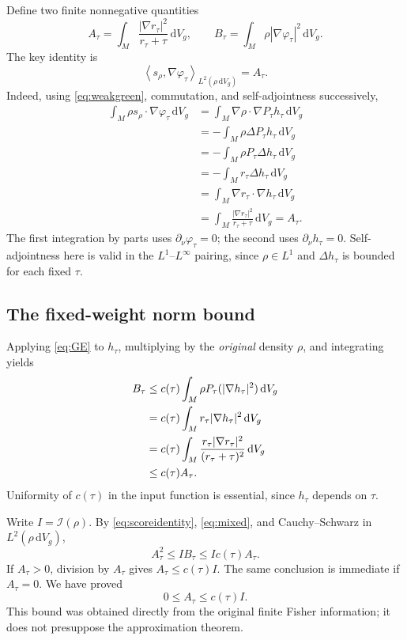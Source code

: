 \documentclass[11pt]{article}
\newcommand{\dd}{\,\mathrm{d}}
\newcommand{\dV}{\dd V_g}
\newcommand{\I}{\mathcal I}
\newcommand{\iprho}[2]{\left\langle #1,#2\right\rangle_{L^2(\rho\,\mathrm{d}V_g)}}
\begin{document}
Define two finite nonnegative quantities
\begin{equation}\label{eq:AB}
 A_\tau=\int_M\frac{|\nabla r_\tau|^2}{r_\tau+\tau}\dV,
 \qquad B_\tau=\int_M\rho|\nabla\varphi_\tau|^2\dV.
\end{equation}
The key identity is
\begin{equation}\label{eq:mixed}
 \iprho{s_\rho}{\nabla\varphi_\tau}=A_\tau.
\end{equation}
Indeed, using \eqref{eq:weakgreen}, commutation, and self-adjointness successively,
\begin{align*}
 \int_M\rho s_\rho\cdot\nabla\varphi_\tau\dV
 &=\int_M\nabla\rho\cdot\nabla P_\tau h_\tau\dV\\
 &=-\int_M\rho\Delta P_\tau h_\tau\dV\\
 &=-\int_M\rho P_\tau\Delta h_\tau\dV\\
 &=-\int_M r_\tau\Delta h_\tau\dV\\
 &=\int_M\nabla r_\tau\cdot\nabla h_\tau\dV\\
 &=\int_M\frac{|\nabla r_\tau|^2}{r_\tau+\tau}\dV=A_\tau.
\end{align*}
The first integration by parts uses $\partial_\nu\varphi_\tau=0$; the second uses $\partial_\nu h_\tau=0$. Self-adjointness here is valid in the $L^1$--$L^\infty$ pairing, since $\rho\in L^1$ and $\Delta h_\tau$ is bounded for each fixed $\tau$.

\subsection{The fixed-weight norm bound}
Applying \eqref{eq:GE} to $h_\tau$, multiplying by the \emph{original} density $\rho$, and integrating yields
\begin{align}
 B_\tau
 &\leq c(\tau)\int_M\rho P_\tau(|\nabla h_\tau|^2)\dV\notag\\
 &=c(\tau)\int_M r_\tau|\nabla h_\tau|^2\dV\notag\\
 &=c(\tau)\int_M\frac{r_\tau|\nabla r_\tau|^2}{(r_\tau+\tau)^2}\dV\notag\\
 &\leq c(\tau)A_\tau.\label{eq:Bbound}
\end{align}
Uniformity of $c(\tau)$ in the input function is essential, since $h_\tau$ depends on $\tau$.

Write $I=\I(\rho)$. By \eqref{eq:scoreidentity}, \eqref{eq:mixed}, and Cauchy--Schwarz in $L^2(\rho\,\mathrm{d}V_g)$,
\[
 A_\tau^2\leq I B_\tau\leq I c(\tau)A_\tau.
\]
If $A_\tau>0$, division by $A_\tau$ gives $A_\tau\leq c(\tau)I$. The same conclusion is immediate if $A_\tau=0$. We have proved
\begin{equation}\label{eq:Abound}
 0\leq A_\tau\leq c(\tau)I.
\end{equation}
This bound was obtained directly from the original finite Fisher information; it does not presuppose the approximation theorem.
\end{document}
